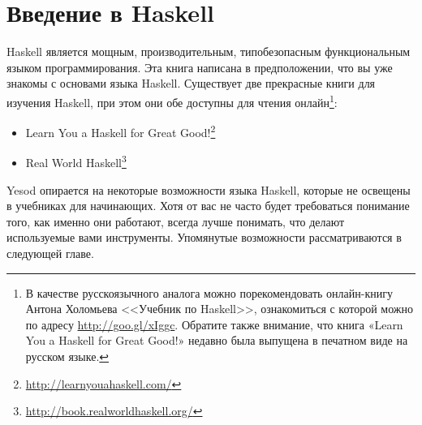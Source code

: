 \section{Введение в Haskell}

Haskell является мощным, производительным, типобезопасным функциональным языком программирования. Эта книга написана в предположении, что вы уже знакомы с основами языка Haskell. Существует две прекрасные книги для изучения Haskell, при этом они обе доступны для чтения онлайн\footnote{В качестве русскоязычного аналога можно порекомендовать онлайн-книгу Антона Холомьева <<Учебник по Haskell>>, ознакомиться с которой можно по адресу \href{http://goo.gl/xIggc}{http://goo.gl/xIggc}. Обратите также внимание, что книга «Learn You a Haskell for Great Good!» недавно была выпущена в печатном виде на русском языке.}:

\begin{itemize}
  \item Learn You a Haskell for Great Good!\footnote{\href{http://learnyouahaskell.com/}{http://learnyouahaskell.com/}}
  \item Real World Haskell\footnote{\href{http://book.realworldhaskell.org/}{http://book.realworldhaskell.org/}}
\end{itemize}

Yesod опирается на некоторые возможности языка Haskell, которые не освещены в учебниках для начинающих. Хотя от вас не часто будет требоваться понимание того, как именно они работают, всегда лучше понимать, что делают используемые вами инструменты. Упомянутые возможности рассматриваются в следующей главе.

